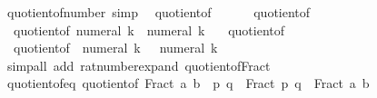 \begin{isabellebody}
\isamarkupfalse%
%
\endisatagproof
{\isafoldproof}%
%
\isadelimproof
\isanewline
%
\endisadelimproof
\isanewline
{}\isamarkupfalse%
\ quotient{\isacharunderscore}{\kern0pt}of{\isacharunderscore}{\kern0pt}number\ {\isacharbrackleft}{\kern0pt}simp{\isacharbrackright}{\kern0pt}{\isacharcolon}{\kern0pt}\isanewline
\ \ {\isachardoublequoteopen}quotient{\isacharunderscore}{\kern0pt}of\ {}\ {\isacharequal}{\kern0pt}\ {\isacharparenleft}{\kern0pt}{}{\isacharcomma}{\kern0pt}\ {}{\isacharparenright}{\kern0pt}{\isachardoublequoteclose}\isanewline
\ \ {\isachardoublequoteopen}quotient{\isacharunderscore}{\kern0pt}of\ {}\ {\isacharequal}{\kern0pt}\ {\isacharparenleft}{\kern0pt}{}{\isacharcomma}{\kern0pt}\ {}{\isacharparenright}{\kern0pt}{\isachardoublequoteclose}\isanewline
\ \ {\isachardoublequoteopen}quotient{\isacharunderscore}{\kern0pt}of\ {\isacharparenleft}{\kern0pt}numeral\ k{\isacharparenright}{\kern0pt}\ {\isacharequal}{\kern0pt}\ {\isacharparenleft}{\kern0pt}numeral\ k{\isacharcomma}{\kern0pt}\ {}{\isacharparenright}{\kern0pt}{\isachardoublequoteclose}\isanewline
\ \ {\isachardoublequoteopen}quotient{\isacharunderscore}{\kern0pt}of\ {\isacharparenleft}{\kern0pt}{\isacharminus}{\kern0pt}\ {}{\isacharparenright}{\kern0pt}\ {\isacharequal}{\kern0pt}\ {\isacharparenleft}{\kern0pt}{\isacharminus}{\kern0pt}\ {}{\isacharcomma}{\kern0pt}\ {}{\isacharparenright}{\kern0pt}{\isachardoublequoteclose}\isanewline
\ \ {\isachardoublequoteopen}quotient{\isacharunderscore}{\kern0pt}of\ {\isacharparenleft}{\kern0pt}{\isacharminus}{\kern0pt}\ numeral\ k{\isacharparenright}{\kern0pt}\ {\isacharequal}{\kern0pt}\ {\isacharparenleft}{\kern0pt}{\isacharminus}{\kern0pt}\ numeral\ k{\isacharcomma}{\kern0pt}\ {}{\isacharparenright}{\kern0pt}{\isachardoublequoteclose}\isanewline
%
\isadelimproof
\ \ %
\endisadelimproof
%
\isatagproof
{}\isamarkupfalse%
\ {\isacharparenleft}{\kern0pt}simp{\isacharunderscore}{\kern0pt}all\ add{\isacharcolon}{\kern0pt}\ rat{\isacharunderscore}{\kern0pt}number{\isacharunderscore}{\kern0pt}expand\ quotient{\isacharunderscore}{\kern0pt}of{\isacharunderscore}{\kern0pt}Fract{\isacharparenright}{\kern0pt}%
\endisatagproof
{\isafoldproof}%
%
\isadelimproof
\isanewline
%
\endisadelimproof
\isanewline
{}\isamarkupfalse%
\ quotient{\isacharunderscore}{\kern0pt}of{\isacharunderscore}{\kern0pt}eq{\isacharcolon}{\kern0pt}\ {\isachardoublequoteopen}quotient{\isacharunderscore}{\kern0pt}of\ {\isacharparenleft}{\kern0pt}Fract\ a\ b{\isacharparenright}{\kern0pt}\ {\isacharequal}{\kern0pt}\ {\isacharparenleft}{\kern0pt}p{\isacharcomma}{\kern0pt}\ q{\isacharparenright}{\kern0pt}\ {\isasymLongrightarrow}\ Fract\ p\ q\ {\isacharequal}{\kern0pt}\ Fract\ a\ b{\isachardoublequoteclose}\isanewline

\end{isabellebody}
